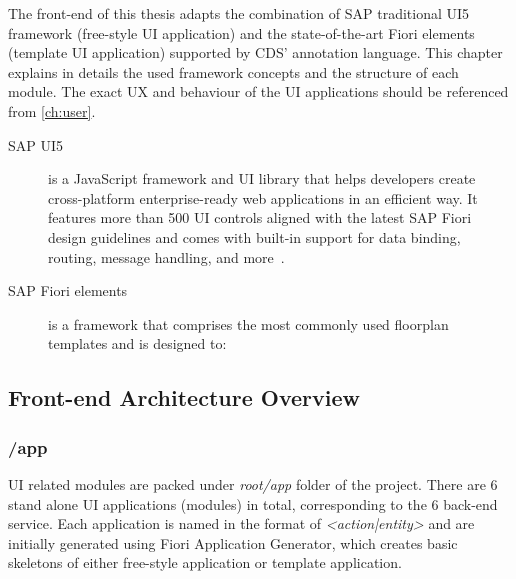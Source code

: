 The front-end of this thesis adapts the combination of SAP traditional UI5 framework (free-style UI application) and the state-of-the-art Fiori elements (template UI application) supported by CDS' annotation language. \cite{fiori-design} This chapter explains in details the used framework concepts and the structure of each module. The exact UX and behaviour of the UI applications should be referenced from \autoref{ch:user}.

\begin{description}
	\item[SAP UI5] is a JavaScript framework and UI library that helps developers create cross-platform enterprise-ready web applications in an efficient way. It features more than 500 UI controls aligned with the latest SAP Fiori design guidelines and comes with built-in support for data binding, routing, message handling, and more~\cite{ui5}.
 
	\item[SAP Fiori elements] is a framework that comprises the most commonly used floorplan templates and is designed to:
      
\end{description}

\subsection{Front-end Architecture Overview}

\subsubsection{/app}

UI related modules are packed under \textit{root/app} folder of the project. There are 6 stand alone UI applications (modules) in total, corresponding to the 6 back-end service. Each application is named in the format of \textit{<action|entity>} and are initially generated using Fiori Application Generator, which creates basic skeletons of either free-style application or template application. 

